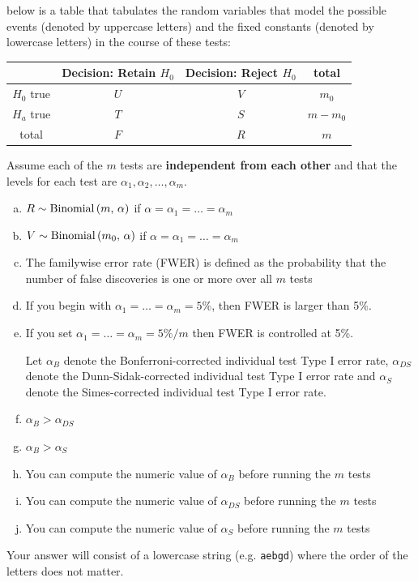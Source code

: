 \documentclass[12pt,landscape]{article}
\newcommand{\instr}{\small Your answer will consist of a lowercase string (e.g. \texttt{aebgd}) where the order of the letters does not matter. \normalsize}
\begin{document}

\problem{}  below is a table that tabulates the random variables that model the possible events (denoted by uppercase letters) and the fixed constants (denoted by lowercase letters) in the course of these tests:

\begin{table}[h]
\centering
\begin{tabular}{c|cc|c}
& Decision: Retain $H_0$ & Decision: Reject $H_0$ & total \\\hline
$H_0$ true & $U$ & $V$ & $m_0$ \\
$H_a$ true & $T$ & $S$ & $m - m_0$ \\ \hline
total & $F$ & $R$ & $m$
\end{tabular}
\end{table}
\FloatBarrier

Assume each of the $m$ tests are \textbf{independent from each other} and that the levels for each test are $\alpha_1, \alpha_2, \ldots, \alpha_m$.

\vspace{-0.2cm}\benum{} 

\begin{enumerate}[(a)]
\item $R \sim \mathrm{Binomial}\left(m,\,\alpha\right)$ if $\alpha = \alpha_1 = \ldots = \alpha_m$
\item $V \sim \mathrm{Binomial}\left(m_0,\,\alpha\right)$ if $\alpha = \alpha_1 = \ldots = \alpha_m$
\item The familywise error rate (FWER) is defined as the probability that the number of false discoveries is one or more over all $m$ tests
\item If you begin with $\alpha_1 = \ldots = \alpha_m = 5\%$, then FWER is larger than 5\%.

\item If you set $\alpha_1 = \ldots = \alpha_m = 5\% / m$ then FWER is controlled at 5\%.

Let $\alpha_{B}$ denote the Bonferroni-corrected individual test Type I error rate, $\alpha_{DS}$ denote the Dunn-Sidak-corrected individual test Type I error rate and $\alpha_{S}$ denote the Simes-corrected individual test Type I error rate.

\item $\alpha_{B} > \alpha_{DS}$
\item $\alpha_{B} > \alpha_{S}$
\item You can compute the numeric value of $\alpha_{B}$ before running the $m$ tests
\item You can compute the numeric value of $\alpha_{DS}$ before running the $m$ tests
\item You can compute the numeric value of $\alpha_{S}$ before running the $m$ tests
\end{enumerate}
\eenum\instr\pagebreak
\end{document}

